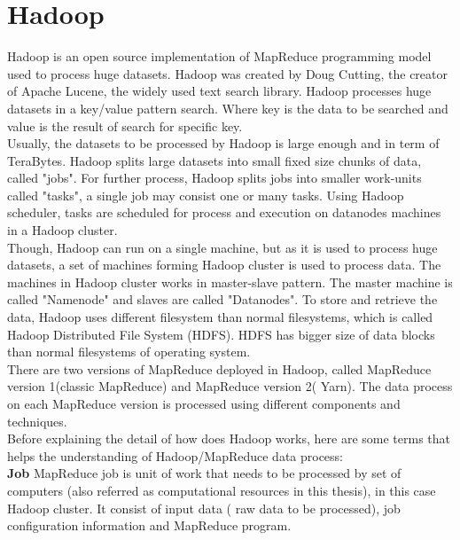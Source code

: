 \section{Hadoop}

Hadoop is an open source implementation of MapReduce programming model used to process huge datasets. Hadoop was created by Doug Cutting, the creator of Apache Lucene, the widely used text search library\cite{tom3}. Hadoop processes huge datasets in a key/value pattern search. Where key is the data to be searched and value is the result of search for specific key. \\

 Usually, the datasets to be processed by Hadoop is large enough and in term of TeraBytes. Hadoop splits large datasets into small fixed size chunks of data, called "jobs". For further process, Hadoop splits jobs into smaller work-units called "tasks", a single job may consist one or many tasks. Using Hadoop scheduler, tasks are scheduled for process and execution on datanodes machines in a Hadoop cluster. \\
 
 Though, Hadoop can run on a single machine, but as it is used to process huge datasets, a set of machines forming Hadoop cluster is used to process data. The machines in Hadoop cluster works in master-slave pattern. The master machine is called "Namenode" and slaves are called "Datanodes". To store and retrieve the data, Hadoop uses different filesystem than normal filesystems, which is called Hadoop Distributed File System (HDFS). HDFS has bigger size of data blocks than normal filesystems of operating system. \\
 
There are two versions of MapReduce deployed in Hadoop, called MapReduce version 1(classic MapReduce) and MapReduce version 2( Yarn). The data process on each MapReduce version is processed using different components and techniques. \\

 Before explaining the detail of how does Hadoop works, here are some terms that helps the understanding of Hadoop/MapReduce data process: \\

\textbf{Job} MapReduce job is unit of work that needs to be processed by set of computers (also referred as computational resources in this thesis), in this case Hadoop cluster. It consist of input data ( raw data to be processed), job configuration information and MapReduce program. 

